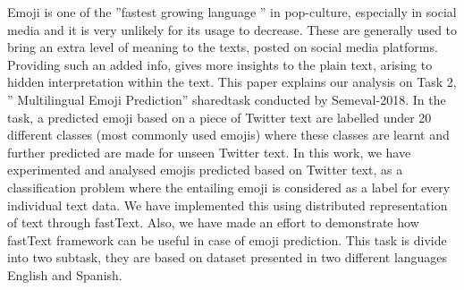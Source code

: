 Emoji is one of the ''fastest growing language '' in pop-culture, especially in social media and it is very unlikely for its usage to decrease. These are generally used to bring an extra level of meaning to the texts, posted on social media platforms. Providing such an added info, gives more insights to the plain text, arising to hidden interpretation within the text. This paper explains our analysis on Task 2, '' Multilingual Emoji Prediction'' sharedtask conducted by Semeval-2018. In the task, a predicted emoji based on a piece of Twitter text are labelled under 20 different classes (most commonly used emojis) where these classes are learnt and further predicted are made for unseen Twitter text. In this work, we have experimented and analysed emojis predicted based on Twitter text, as a classification problem where the entailing emoji is considered as a label for every individual text data. We have implemented this using distributed representation of text through fastText. Also, we have made an effort to demonstrate how fastText framework can be useful in case of emoji prediction. This task is divide into two subtask, they are based on dataset presented in two different languages English and Spanish.
